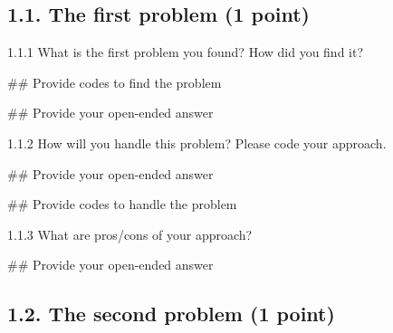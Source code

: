 \documentclass[
  letterpaper,
]{scrbook}
\newenvironment{Shaded}{\begin{snugshade}}{\end{snugshade}}
\newcommand{\CommentTok}[1]{\textcolor[rgb]{0.37,0.37,0.37}{#1}}
\begin{document}
\subsection*{1.1. The first problem (1
point)}\label{the-first-problem-1-point}

1.1.1 What is the first problem you found? How did you find it?

\begin{Shaded}
\begin{Highlighting}[]
\CommentTok{\#\# Provide codes to find the problem}
\end{Highlighting}
\end{Shaded}

\begin{Shaded}
\begin{Highlighting}[]
\CommentTok{\#\# Provide your open{-}ended answer}
\end{Highlighting}
\end{Shaded}

1.1.2 How will you handle this problem? Please code your approach.

\begin{Shaded}
\begin{Highlighting}[]
\CommentTok{\#\# Provide your open{-}ended answer}
\end{Highlighting}
\end{Shaded}

\begin{Shaded}
\begin{Highlighting}[]
\CommentTok{\#\# Provide codes to handle the problem}
\end{Highlighting}
\end{Shaded}

1.1.3 What are pros/cons of your approach?

\begin{Shaded}
\begin{Highlighting}[]
\CommentTok{\#\# Provide your open{-}ended answer}
\end{Highlighting}
\end{Shaded}

\subsection*{1.2. The second problem (1
point)}\label{the-second-problem-1-point}
\end{document}
